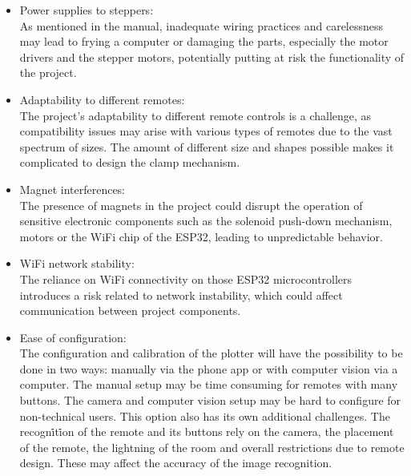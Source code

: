 \begin{itemize}
    \item Power supplies to steppers:\\
        As mentioned in the manual, inadequate wiring practices and carelessness may lead to frying a computer or damaging the parts, especially the motor drivers and the stepper motors, potentially putting at risk the functionality of the project.
    \item Adaptability to different remotes:\\
        The project's adaptability to different remote controls is a challenge, as compatibility issues may arise with various types of remotes due to the vast spectrum of sizes. The amount of different size and shapes possible makes it complicated to design the clamp mechanism. 
    \item Magnet interferences:\\
        The presence of magnets in the project could disrupt the operation of sensitive electronic components such as the solenoid push-down mechanism, motors or the WiFi chip of the ESP32, leading to unpredictable behavior.
    \item WiFi network stability:\\
        The reliance on WiFi connectivity on those ESP32 microcontrollers introduces a risk related to network instability, which could affect communication between project components.
    \item Ease of configuration:\\
        The configuration and calibration of the plotter will have the possibility to be done in two ways: manually via the phone app or with computer vision via a computer. The manual setup may be time consuming for remotes with many buttons. 
        The camera and computer vision setup may be hard to configure for non-technical users. This option also has its own additional challenges. The recogni̇ti̇on of the remote and its buttons rely on the camera, the placement of the remote, the lightning of the room
        and overall restrictions due to remote design. These may affect the accuracy of the image recognition.
\end{itemize}
